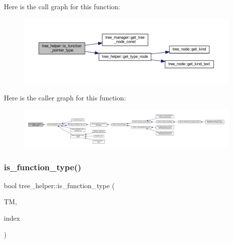 Here is the call graph for this function\+:
\nopagebreak
\begin{figure}[H]
\begin{center}
\leavevmode
\includegraphics[width=350pt]{d7/d99/classtree__helper_a05f90f478c4b88ce9445b6537e046a2d_cgraph}
\end{center}
\end{figure}
Here is the caller graph for this function\+:
\nopagebreak
\begin{figure}[H]
\begin{center}
\leavevmode
\includegraphics[width=350pt]{d7/d99/classtree__helper_a05f90f478c4b88ce9445b6537e046a2d_icgraph}
\end{center}
\end{figure}
\mbox{\label{classtree__helper_aaee6527f97763e85b8cf0446e92f562c}} 
\subsubsection{\texorpdfstring{is\+\_\+function\+\_\+type()}{is\_function\_type()}}
{\footnotesize\ttfamily bool tree\+\_\+helper\+::is\+\_\+function\+\_\+type (\begin{DoxyParamCaption}\item[{const \hyperlink{tree__manager_8hpp_a792e3f1f892d7d997a8d8a4a12e39346}{tree\+\_\+manager\+Const\+Ref} \&}]{TM,  }\item[{const unsigned int}]{index }\end{DoxyParamCaption})\hspace{0.3cm}{\ttfamily [static]}}



